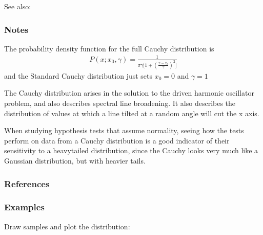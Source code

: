 \documentclass[letterpaper,10pt,english]{sphinxmanual}
\begin{document}
\begin{fulllineitems}
\begin{sphinxseealso}{See also:}
\begin{description}
\end{description}


\end{sphinxseealso}

\subsubsection*{Notes}

\sphinxAtStartPar
The probability density function for the full Cauchy distribution is
\begin{equation*}
\begin{split}P(x; x_0, \gamma) = \frac{1}{\pi \gamma \bigl[ 1+
(\frac{x-x_0}{\gamma})^2 \bigr] }\end{split}
\end{equation*}
\sphinxAtStartPar
and the Standard Cauchy distribution just sets \(x_0=0\) and
\(\gamma=1\)

\sphinxAtStartPar
The Cauchy distribution arises in the solution to the driven harmonic
oscillator problem, and also describes spectral line broadening. It
also describes the distribution of values at which a line tilted at
a random angle will cut the x axis.

\sphinxAtStartPar
When studying hypothesis tests that assume normality, seeing how the
tests perform on data from a Cauchy distribution is a good indicator of
their sensitivity to a heavy\sphinxhyphen{}tailed distribution, since the Cauchy looks
very much like a Gaussian distribution, but with heavier tails.
\subsubsection*{References}
\subsubsection*{Examples}

\sphinxAtStartPar
Draw samples and plot the distribution:

\begin{sphinxVerbatim}[commandchars=\\\{\}]
   
  
  \PYG{p}{[}  \PYG{p}{]}  
 
\end{sphinxVerbatim}

\end{fulllineitems}
\end{document}
